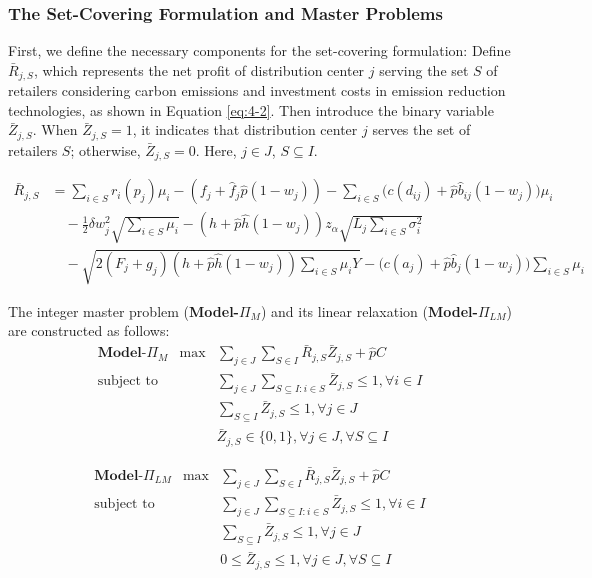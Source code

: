 \documentclass[]{article}
\theoremstyle{plain}%
\theoremstyle{definition}
\theoremstyle{remark}
\theoremstyle{plain}%
\begin{document}
    \subsubsection{The Set-Covering Formulation and Master Problems}
    
    First, we define the necessary components for the set-covering formulation:
    Define $\bar{R}_{j,S}$, which represents the net profit of distribution center $j$ serving the set $S$ of retailers considering carbon emissions and investment costs in emission reduction technologies, as shown in Equation \ref{eq:4-2}. Then introduce the binary variable $\bar{Z}_{j,S}$. When $\bar{Z}_{j,S}=1$, it indicates that distribution center $j$ serves the set of retailers $S$; otherwise, $\bar{Z}_{j,S}=0$. Here, $j\in J$, $S\subseteq I$.
    
    \begin{equation}
    \begin{aligned}
        \label{eq:4-2}
        \bar{R}_{j,S} &= 
        \sum_{i\in S}r_i(p_j)\mu_i-(f_j+\hat{f}_j\hat{p}(1-w_j))  -\sum_{i\in S}\big(c(d_{ij})+\hat{p}\hat{b}_{ij}(1-w_j)\big)\mu_i \\
        &\quad -\frac{1}{2}\delta w^2_j \sqrt{\sum_{i\in S}\mu_i}  -(h+\hat{p}\hat{h}(1-w_j))z_{\alpha} \sqrt{L_j\sum_{i\in S}\sigma^2_i} \\
        &\quad -\sqrt{2({F_j+g_j})(h+\hat{p}\hat{h}(1-w_j))\sum_{i\in S}\mu_i Y}  -\big(c(a_{j})+\hat{p}\hat{b}_j(1-w_j)\big)\sum_{i\in S}\mu_i 
    \end{aligned}
    \end{equation}
    
    
    
    The integer master problem (\textbf{Model-}$\Pi_M$) and its linear relaxation (\textbf{Model-}$\Pi_{LM}$) are constructed as follows:
    \begin{align}
    \label{model3}
    & \textbf{Model-} \Pi_M & \max    & \sum_{j\in J} \sum_{S\in I}\bar{R}_{j,S}\bar{Z}_{j,S}+\hat{p}C  &\\
    & \mbox{subject to} && \sum_{j\in J}\sum_{S\subseteq I:i\in S} \bar{Z}_{j,S} \leq 1, \forall{i\in I} &\\
    &&& \sum_{S\subseteq I} \bar{Z}_{j,S} \leq 1,   \forall{j\in J} & \label{cons:4-3}\\
    &&& \bar{Z}_{j,S} \in \{0,1\},  \forall{j\in J}, \forall{S\subseteq I} &
    \end{align}
    
    
    \begin{align}
    \label{model4}
    & \textbf{Model-} \Pi_{LM} & \max    & \sum_{j\in J} \sum_{S\in I}\bar{R}_{j,S}\bar{Z}_{j,S}+\hat{p}C  &\\
    & \mbox{subject to} && \sum_{j\in J}\sum_{S\subseteq I:i\in S} \bar{Z}_{j,S} \leq 1, \forall{i\in I} &\\
    &&& \sum_{S\subseteq I} \bar{Z}_{j,S} \leq 1,   \forall{j\in J} &\\
    &&& 0 \leq \bar{Z}_{j,S} \leq 1 ,  \forall{j\in J}, \forall{S\subseteq I} &
    \end{align}
    
\end{document}
